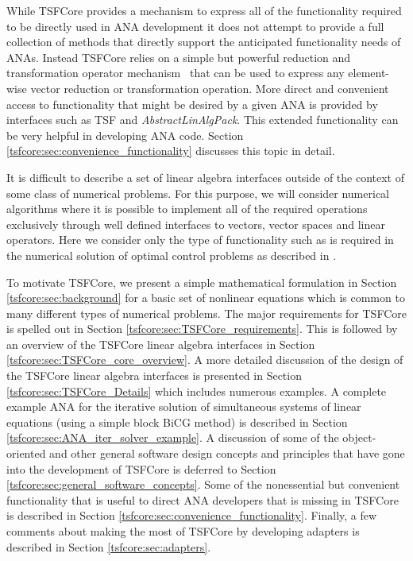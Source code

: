 While TSFCore provides a mechanism to express all of the functionality
required to be directly used in ANA development it does not attempt to
provide a full collection of methods that directly support the
anticipated functionality needs of ANAs.  Instead TSFCore relies on a
simple but powerful reduction and transformation operator
mechanism~\cite{ref:rtop_toms} that can be used to express any
element-wise vector reduction or transformation operation.  More
direct and convenient access to functionality that might be desired by
a given ANA is provided by interfaces such as TSF and
\textit{AbstractLinAlgPack}.  This extended functionality can be very
helpful in developing ANA code.  Section
\ref{tsfcore:sec:convenience_functionality} discusses this topic in
detail.

It is difficult to describe a set of linear algebra interfaces outside
of the context of some class of numerical problems.  For this purpose,
we will consider numerical algorithms where it is possible to
implement all of the required operations exclusively through well
defined interfaces to vectors, vector spaces and linear operators.
Here we consider only the type of functionality such as is required in
the numerical solution of optimal control problems as described in
\cite{ref:opt_ctrl_itfc}.

To motivate TSFCore, we present a simple mathematical formulation in
Section \ref{tsfcore:sec:background} for a basic set of nonlinear
equations which is common to many different types of numerical
problems.  The major requirements for TSFCore is spelled out in
Section \ref{tsfcore:sec:TSFCore_requirements}.  This is followed by
an overview of the TSFCore linear algebra interfaces in Section
\ref{tsfcore:sec:TSFCore_core_overview}.  A more detailed discussion of the
design of the TSFCore linear algebra interfaces is presented in
Section \ref{tsfcore:sec:TSFCore_Details} which includes numerous
examples.  A complete example ANA for the iterative solution of
simultaneous systems of linear equations (using a simple block BiCG
method) is described in Section
\ref{tsfcore:sec:ANA_iter_solver_example}.  A discussion of some of the
object-oriented and other general software design concepts and
principles that have gone into the development of TSFCore is deferred
to Section \ref{tsfcore:sec:general_software_concepts}.  Some of the
nonessential but convenient functionality that is useful to direct ANA
developers that is missing in TSFCore is described in Section
\ref{tsfcore:sec:convenience_functionality}. Finally, a few comments
about making the most of TSFCore by developing adapters is described in
Section \ref{tsfcore:sec:adapters}.

